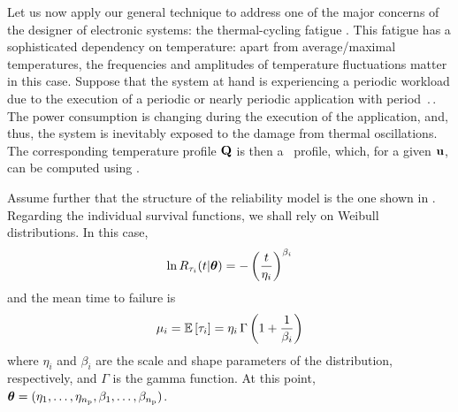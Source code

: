 Let us now apply our general technique to address one of the major concerns of the designer of electronic systems: the thermal-cycling fatigue \cite{jedec}.
This fatigue has a sophisticated dependency on temperature: apart from average/maximal temperatures, the frequencies and amplitudes of temperature fluctuations matter in this case.
Suppose that the system at hand is experiencing a periodic workload due to the execution of a periodic or nearly periodic application with period $\period$.
The power consumption is changing during the execution of the application, and, thus, the system is inevitably exposed to the damage from thermal oscillations.
The corresponding temperature profile $\mathbf{Q}$ is then a \DSS\ profile, which, for a given $\mathbf{u}$, can be computed using .

Assume further that the structure of the reliability model is the one shown in .
Regarding the individual survival functions, we shall rely on Weibull distributions.
In this case,
\begin{equation} \elab{weibull-model}
  \ln \survival_{\T_i}(\t | \pvw) = -\left( \frac{\t}{\eta_i} \right)^{\beta_i}
\end{equation}
and the mean time to failure is
\begin{equation} \elab{weibull-expectation}
  \mu_i = \expectation{\T_i} = \eta_i \, \Gamma\left(1 + \frac{1}{\beta_i}\right)
\end{equation}
where $\eta_i$ and $\beta_i$ are the scale and shape parameters of the distribution, respectively, and $\Gamma$ is the gamma function.
At this point, $\bm{\theta} = (\eta_1, \dotsc, \eta_{n_\text{p}}, \beta_1, \dotsc, \beta_{n_\text{p}})$.

